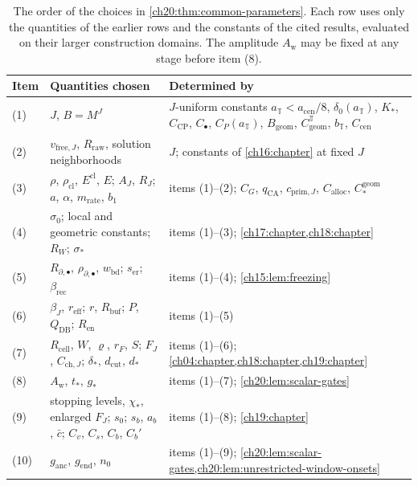 \begin{table}[ht]
\centering
\small
\begin{tabular}{@{}l>{\raggedright\arraybackslash}p{}>{\raggedright\arraybackslash}p{}@{}}
\toprule
Item & Quantities chosen & Determined by \\
\midrule
(1) & $J$, $B=M^J$ & $J$-uniform constants $a_{\mathbb T}<a_{\mathrm{cen}}/8$, $\delta_0(a_{\mathbb T})$, $K_*$, $C_{\mathrm{CP}}$, $C_\bullet$, $C_P(a_{\mathbb T})$, $B_{\mathrm{geom}}$, $C^{\mathbb T}_{\mathrm{geom}}$, $b_{\mathbb T}$, $C_{\mathrm{cen}}$ \\
(2) & $v_{\mathrm{free},J}$, $R_{\mathrm{raw}}$, solution neighborhoods & $J$; constants of \cref{ch16:chapter} at fixed $J$ \\
(3) & $\rho$, $\rho_{\mathrm{cl}}$, $E^{\mathrm{cl}}$, $E$; $A_J$, $R_J$; $a$, $\alpha$, $m_{\mathrm{rate}}$, $b_1$ & items (1)--(2); $C_G$, $q_{\mathrm{CA}}$, $c_{\mathrm{prim},J}$, $C_{\mathrm{alloc}}$, $C^{\mathrm{geom}}_*$ \\
(4) & $\sigma_0$; local and geometric constants; $R_W$; $\sigma_*$ & items (1)--(3); \cref{ch17:chapter,ch18:chapter} \\
(5) & $R_{\partial,\bullet}$, $\rho_{\partial,\bullet}$, $w_{\mathrm{bd}}$; $s_{\mathrm{er}}$; $\beta_{\mathrm{rec}}$ & items (1)--(4); \cref{ch15:lem:freezing} \\
(6) & $\beta_J$, $r_{\mathrm{eff}}$; $r$, $R_{\mathrm{buf}}$; $P$, $Q_{\mathrm{DB}}$; $R_{\mathrm{en}}$ & items (1)--(5) \\
(7) & $R_{\mathrm{cell}}$, $W$, $\varrho$, $r_F$, $S$; $F_J$, $C_{\mathrm{ch},J}$; $\delta_*$, $d_{\mathrm{cut}}$, $d_*$ & items (1)--(6); \cref{ch04:chapter,ch18:chapter,ch19:chapter} \\
(8) & $A_{\mathrm w}$, $t_*$, $g_*$ & items (1)--(7); \cref{ch20:lem:scalar-gates} \\
(9) & stopping levels, $\chi_*$, enlarged $F_J$; $s_0$; $s_b$, $a_b$, $\bar c$; $C_v$, $C_s$, $C_b$, $C_b'$ & items (1)--(8); \cref{ch19:chapter} \\
(10) & $g_{\mathrm{anc}}$, $g_{\mathrm{end}}$, $n_0$ & items (1)--(9); \cref{ch20:lem:scalar-gates,ch20:lem:unrestricted-window-onsets} \\
\bottomrule
\end{tabular}
\caption{The order of the choices in \cref{ch20:thm:common-parameters}. Each row uses only the quantities of the earlier rows and the constants of the cited results, evaluated on their larger construction domains. The amplitude $A_{\mathrm w}$ may be fixed at any stage before item (8).}
\label{ch20:tab:parameter-order}
\end{table}

